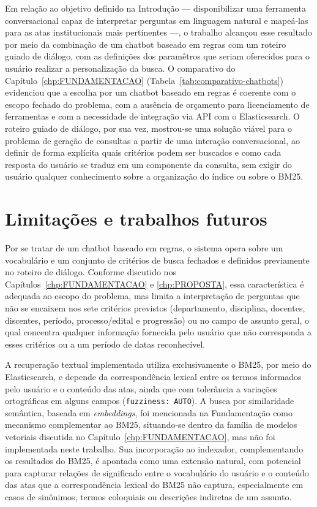 Em relação ao objetivo definido na Introdução — disponibilizar uma ferramenta conversacional capaz de interpretar perguntas em linguagem natural e mapeá-las para as atas institucionais mais pertinentes —, o trabalho alcançou esse resultado por meio da combinação de um chatbot baseado em regras com um roteiro guiado de diálogo, com as definições dos paramêtros que seriam oferecidos para o usuário realizar a personalização da busca. O comparativo do Capítulo~\ref{chp:FUNDAMENTACAO} (Tabela~\ref{tab:comparativo-chatbots}) evidenciou que a escolha por um chatbot baseado em regras é coerente com o escopo fechado do problema, com a ausência de orçamento para licenciamento de ferramentas e com a necessidade de integração via API com o Elasticsearch. O roteiro guiado de diálogo, por sua vez, mostrou-se uma solução viável para o problema de geração de consultas a partir de uma interação conversacional, ao definir de forma explícita quais critérios podem ser buscados e como cada resposta do usuário se traduz em um componente da consulta, sem exigir do usuário qualquer conhecimento sobre a organização do índice ou sobre o BM25.

\section{Limitações e trabalhos futuros}

Por se tratar de um chatbot baseado em regras, o sistema opera sobre um vocabulário e um conjunto de critérios de busca fechados e definidos previamente no roteiro de diálogo. Conforme discutido nos Capítulos~\ref{chp:FUNDAMENTACAO} e \ref{chp:PROPOSTA}, essa característica é adequada ao escopo do problema, mas limita a interpretação de perguntas que não se encaixem nos sete critérios previstos (departamento, disciplina, docentes, discentes, período, processo/edital e progressão) ou no campo de assunto geral, o qual concentra qualquer informação fornecida pelo usuário que não corresponda a esses critérios ou a um período de datas reconhecível.

A recuperação textual implementada utiliza exclusivamente o BM25, por meio do Elasticsearch, e depende da correspondência lexical entre os termos informados pelo usuário e o conteúdo das atas, ainda que com tolerância a variações ortográficas em alguns campos (\texttt{fuzziness: AUTO}). A busca por similaridade semântica, baseada em \textit{embeddings}, foi mencionada na Fundamentação como mecanismo complementar ao BM25, situando-se dentro da família de modelos vetoriais discutida no Capítulo~\ref{chp:FUNDAMENTACAO}, mas não foi implementada neste trabalho. Sua incorporação ao indexador, complementando os resultados do BM25, é apontada como uma extensão natural, com potencial para capturar relações de significado entre o vocabulário do usuário e o conteúdo das atas que a correspondência lexical do BM25 não captura, especialmente em casos de sinônimos, termos coloquiais ou descrições indiretas de um assunto.

